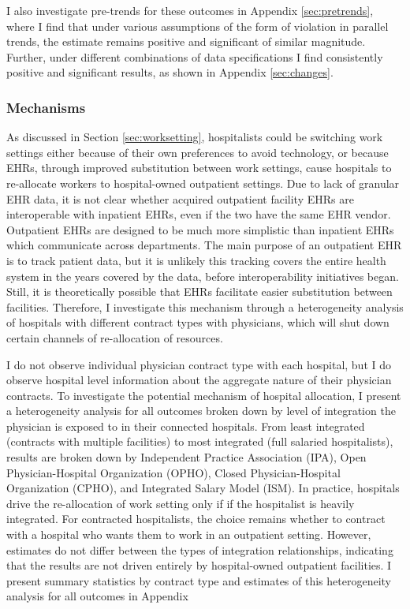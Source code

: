 \documentclass[12pt]{article}
\begin{document}
I also investigate pre-trends for these outcomes in Appendix \ref{sec:pretrends}, where I find that under various assumptions of the form of violation in parallel trends, the estimate remains positive and significant of similar magnitude. Further, under different combinations of data specifications I find consistently positive and significant results, as shown in Appendix \ref{sec:changes}. 

\subsubsection{Mechanisms}

As discussed in Section \ref{sec:worksetting}, hospitalists could be switching work settings either because of their own preferences to avoid technology, or because EHRs, through improved substitution between work settings, cause hospitals to re-allocate workers to hospital-owned outpatient settings. Due to lack of granular EHR data, it is not clear whether acquired outpatient facility EHRs are interoperable with inpatient EHRs, even if the two have the same EHR vendor. Outpatient EHRs are designed to be much more simplistic than inpatient EHRs which communicate across departments. The main purpose of an outpatient EHR is to track patient data, but it is unlikely this tracking covers the entire health system in the years covered by the data, before interoperability initiatives began. Still, it is theoretically possible that EHRs facilitate easier substitution between facilities. Therefore, I investigate this mechanism through a heterogeneity analysis of hospitals with different contract types with physicians, which will shut down certain channels of re-allocation of resources.

I do not observe individual physician contract type with each hospital, but I do observe hospital level information about the aggregate nature of their physician contracts. To investigate the potential mechanism of hospital allocation, I present a heterogeneity analysis for all outcomes broken down by level of integration the physician is exposed to in their connected hospitals. From least integrated (contracts with multiple facilities) to most integrated (full salaried hospitalists), results are broken down by Independent Practice Association (IPA), Open Physician-Hospital Organization (OPHO), Closed Physician-Hospital Organization (CPHO), and Integrated Salary Model (ISM). In practice, hospitals drive the re-allocation of work setting only if if the hospitalist is heavily integrated. For contracted hospitalists, the choice remains whether to contract with a hospital who wants them to work in an outpatient setting. However, estimates do not differ between the types of integration relationships, indicating that the results are not driven entirely by hospital-owned outpatient facilities. I present summary statistics by contract type and estimates of this heterogeneity analysis for all outcomes in Appendix 
\end{document}
